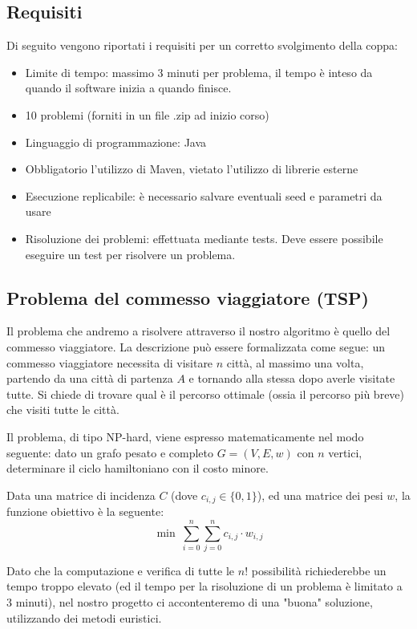 \documentclass{article}
\newenvironment{itm}{
\begin{itemize}
  \setlength{\itemsep}{2pt}
  \setlength{\parskip}{2pt}
}{\end{itemize}}
\begin{document}
\subsection{Requisiti}
Di seguito vengono riportati i requisiti per un corretto svolgimento della coppa:
\begin{itm}
    \item Limite di tempo: massimo 3 minuti per problema,
    il tempo è inteso da quando il software inizia a quando finisce.
    \item 10 problemi (forniti in un file .zip ad inizio corso)
    \item Linguaggio di programmazione: Java
    \item Obbligatorio l'utilizzo di Maven, vietato l'utilizzo di librerie esterne
    \item Esecuzione replicabile: è necessario salvare eventuali seed e parametri da usare
    \item Risoluzione dei problemi: effettuata mediante tests. Deve essere possibile
    eseguire un test per risolvere un problema.
\end{itm}

\subsection{Problema del commesso viaggiatore (TSP)}
Il problema che andremo a risolvere attraverso il nostro
algoritmo è quello del commesso viaggiatore.
La descrizione può essere formalizzata come segue:
un commesso viaggiatore necessita di visitare $n$ città, al
massimo una volta, partendo da una città di partenza $A$ e tornando
alla stessa dopo averle visitate tutte. Si chiede di trovare
qual è il percorso ottimale (ossia il percorso più breve)
che visiti tutte le città.

Il problema, di tipo NP-hard, viene espresso matematicamente nel modo seguente:
dato un grafo pesato e completo $G = (V, E, w)$ con $n$ vertici, determinare il
ciclo hamiltoniano con il costo minore.

Data una matrice di incidenza $C$ (dove $c_{i,j} \in \{0,1\}$),
ed una matrice dei pesi $w$,
la funzione obiettivo è la seguente:
\begin{equation}
    \min \ \sum_{i = 0}^n \sum_{j = 0}^n c_{i,j} \cdot w_{i,j}
\end{equation}

Dato che la computazione e verifica di tutte le $n!$ possibilità richiederebbe
un tempo troppo elevato (ed il tempo per la risoluzione di un
problema è limitato a 3 minuti),
nel nostro progetto ci accontenteremo di una "buona" soluzione,
utilizzando dei metodi euristici.
\end{document}
